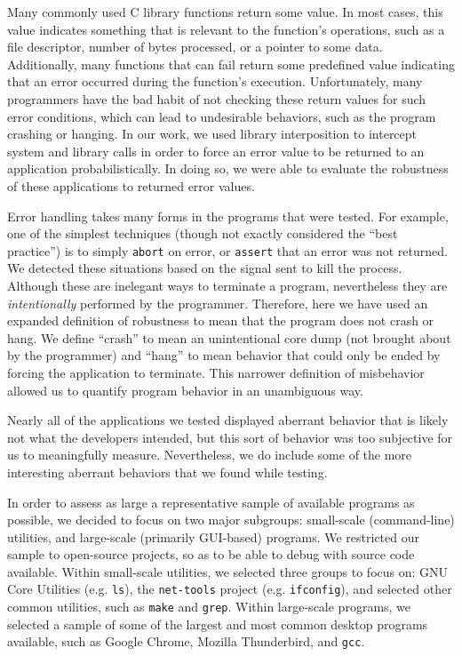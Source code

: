Many commonly used C library functions return some value. In most cases, this value indicates something that is relevant to the  function's operations, such as a file descriptor, number of bytes processed, or a pointer to some data. Additionally, many functions that can fail return some predefined value indicating that an error occurred during the function's execution. Unfortunately, many programmers have the bad habit of not checking these return values for such error conditions, which can lead to undesirable behaviors, such as the program crashing or hanging. In our work, we used library interposition to intercept system and library calls in order to force an error value to be returned to an application probabilistically. In doing so, we were able to evaluate the robustness of these applications to returned error values.

Error handling takes many forms in the programs that were tested. For example, one of the simplest techniques (though not exactly considered the ``best practice'') is to simply \texttt{abort} on error, or \texttt{assert} that an error was not returned. We detected these situations based on the signal sent to kill the process. Although these are inelegant ways to terminate a program, nevertheless they are \emph{intentionally} performed by the programmer. Therefore, here we have used an expanded definition of robustness to mean that the program does not crash or hang. We define ``crash'' to mean an unintentional core dump (not brought about by the programmer) and ``hang'' to mean behavior that could only be ended by forcing the application to terminate. This narrower definition of misbehavior allowed us to quantify program behavior in an unambiguous way.

Nearly all of the applications we tested displayed aberrant behavior that is likely not what the developers intended, but this sort of behavior was too subjective for us to meaningfully measure. Nevertheless, we do include some of the more interesting aberrant behaviors that we found while testing.

In order to assess as large a representative sample of available programs as possible, we decided to focus on two major subgroups: small-scale (command-line) utilities, and large-scale (primarily GUI-based) programs. We restricted our sample to open-source projects, so as to be able to debug with source code available. Within small-scale utilities, we selected three groups to focus on: GNU Core Utilities (e.g. \texttt{ls}), the \texttt{net-tools} project (e.g. \texttt{ifconfig}), and selected other common utilities, such as \texttt{make} and \texttt{grep}. Within large-scale programs, we selected a sample of some of the largest and most common desktop programs available, such as Google Chrome, Mozilla Thunderbird, and \texttt{gcc}.
